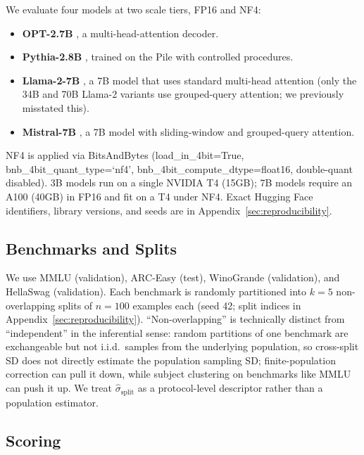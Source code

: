 \documentclass{article}
\begin{document}
We evaluate four models at two scale tiers, FP16 and NF4:
\begin{itemize}
    \item \textbf{OPT-2.7B} \citep{zhang2022opt}, a multi-head-attention decoder.
    \item \textbf{Pythia-2.8B} \citep{biderman2023pythia}, trained on the Pile with controlled procedures.
    \item \textbf{Llama-2-7B} \citep{touvron2023llama2}, a 7B model that uses standard multi-head attention (only the 34B and 70B Llama-2 variants use grouped-query attention; we previously misstated this).
    \item \textbf{Mistral-7B} \citep{jiang2023mistral}, a 7B model with sliding-window and grouped-query attention.
\end{itemize}
NF4 is applied via BitsAndBytes (load\_in\_4bit=True, bnb\_4bit\_quant\_type=`nf4', bnb\_4bit\_compute\_dtype=float16, double-quant disabled). 3B models run on a single NVIDIA T4 (15GB); 7B models require an A100 (40GB) in FP16 and fit on a T4 under NF4. Exact Hugging Face identifiers, library versions, and seeds are in Appendix~\ref{sec:reproducibility}.

\subsection{Benchmarks and Splits}

We use MMLU \citep{hendrycks2021measuring} (validation), ARC-Easy \citep{clark2018arc} (test), WinoGrande \citep{sakaguchi2020winogrande} (validation), and HellaSwag \citep{zellers2019hellaswag} (validation). Each benchmark is randomly partitioned into $k{=}5$ non-overlapping splits of $n{=}100$ examples each (seed 42; split indices in Appendix~\ref{sec:reproducibility}). ``Non-overlapping'' is technically distinct from ``independent'' in the inferential sense: random partitions of one benchmark are exchangeable but not i.i.d.\ samples from the underlying population, so cross-split SD does not directly estimate the population sampling SD; finite-population correction can pull it down, while subject clustering on benchmarks like MMLU can push it up. We treat $\hat\sigma_{\text{split}}$ as a protocol-level descriptor rather than a population estimator.

\subsection{Scoring}
\end{document}
